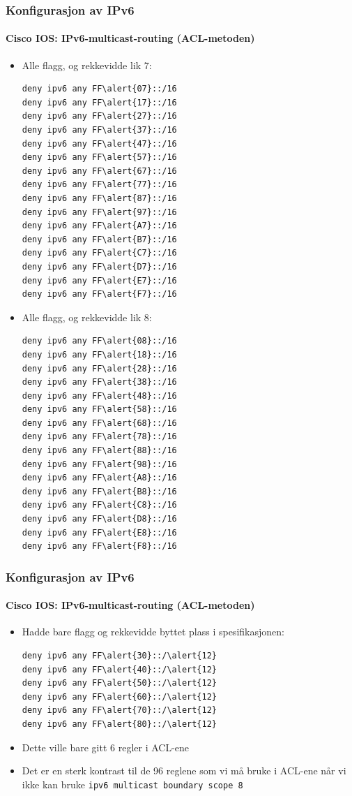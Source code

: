 \begin{frame}[fragile]
  \frametitle{Konfigurasjon av IPv6}
  \framesubtitle{Cisco IOS: IPv6-multicast-routing (ACL-metoden)}
  \begin{multicols}{2}
    \begin{itemize}
    \item Alle flagg, og rekkevidde lik 7:
\begin{Verbatim}[commandchars=\\\{\},fontsize=\scriptsize]
deny ipv6 any FF\alert{07}::/16
deny ipv6 any FF\alert{17}::/16
deny ipv6 any FF\alert{27}::/16
deny ipv6 any FF\alert{37}::/16
deny ipv6 any FF\alert{47}::/16
deny ipv6 any FF\alert{57}::/16
deny ipv6 any FF\alert{67}::/16
deny ipv6 any FF\alert{77}::/16
deny ipv6 any FF\alert{87}::/16
deny ipv6 any FF\alert{97}::/16
deny ipv6 any FF\alert{A7}::/16
deny ipv6 any FF\alert{B7}::/16
deny ipv6 any FF\alert{C7}::/16
deny ipv6 any FF\alert{D7}::/16
deny ipv6 any FF\alert{E7}::/16
deny ipv6 any FF\alert{F7}::/16
\end{Verbatim}
    \item Alle flagg, og rekkevidde lik 8:
\begin{Verbatim}[commandchars=\\\{\},fontsize=\scriptsize]
deny ipv6 any FF\alert{08}::/16
deny ipv6 any FF\alert{18}::/16
deny ipv6 any FF\alert{28}::/16
deny ipv6 any FF\alert{38}::/16
deny ipv6 any FF\alert{48}::/16
deny ipv6 any FF\alert{58}::/16
deny ipv6 any FF\alert{68}::/16
deny ipv6 any FF\alert{78}::/16
deny ipv6 any FF\alert{88}::/16
deny ipv6 any FF\alert{98}::/16
deny ipv6 any FF\alert{A8}::/16
deny ipv6 any FF\alert{B8}::/16
deny ipv6 any FF\alert{C8}::/16
deny ipv6 any FF\alert{D8}::/16
deny ipv6 any FF\alert{E8}::/16
deny ipv6 any FF\alert{F8}::/16
\end{Verbatim}
    \end{itemize}
  \end{multicols}
\end{frame}

\begin{frame}[fragile]
  \frametitle{Konfigurasjon av IPv6}
  \framesubtitle{Cisco IOS: IPv6-multicast-routing (ACL-metoden)}
  \begin{itemize}
    \item Hadde bare flagg og rekkevidde byttet plass i spesifikasjonen:
\begin{Verbatim}[commandchars=\\\{\}]
deny ipv6 any FF\alert{30}::/\alert{12}
deny ipv6 any FF\alert{40}::/\alert{12}
deny ipv6 any FF\alert{50}::/\alert{12}
deny ipv6 any FF\alert{60}::/\alert{12}
deny ipv6 any FF\alert{70}::/\alert{12}
deny ipv6 any FF\alert{80}::/\alert{12}
\end{Verbatim}
    \item Dette ville bare gitt 6 regler i ACL-ene
    \item Det er en sterk kontrast til de 96 reglene som vi må bruke i
      ACL-ene når vi ikke kan bruke \texttt{ipv6 multicast boundary
        scope 8}
  \end{itemize}
\end{frame}

